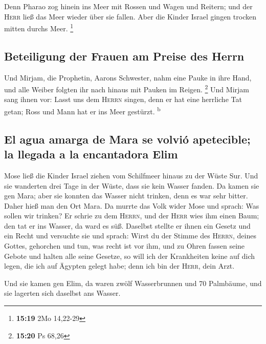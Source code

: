  Denn Pharao zog hinein ins Meer mit Rossen und Wagen und
Reitern; und der \textsc{Herr} ließ das Meer wieder über sie fallen.
Aber die Kinder Israel gingen trocken mitten durchs Meer. \footnote{\textbf{15:19}
  2Mo 14,22-29}

\hypertarget{beteiligung-der-frauen-am-preise-des-herrn}{%
\subsection{Beteiligung der Frauen am Preise des
Herrn}\label{beteiligung-der-frauen-am-preise-des-herrn}}

 Und Mirjam, die Prophetin, Aarons Schwester, nahm eine
Pauke in ihre Hand, und alle Weiber folgten ihr nach hinaus mit Pauken
im Reigen. \footnote{\textbf{15:20} Ps 68,26}  Und Mirjam
sang ihnen vor: Lasst uns dem \textsc{Herrn} singen, denn er hat eine
herrliche Tat getan; Ross und Mann hat er ins Meer gestürzt.
\textsuperscript{b}

\hypertarget{el-agua-amarga-de-mara-se-volviuxf3-apetecible-la-llegada-a-la-encantadora-elim}{%
\subsection{El agua amarga de Mara se volvió apetecible; la llegada a la
encantadora
Elim}\label{el-agua-amarga-de-mara-se-volviuxf3-apetecible-la-llegada-a-la-encantadora-elim}}

 Mose ließ die Kinder Israel ziehen vom Schilfmeer hinaus
zu der Wüste Sur. Und sie wanderten drei Tage in der Wüste, dass sie
kein Wasser fanden.  Da kamen sie gen Mara; aber sie
konnten das Wasser nicht trinken, denn es war sehr bitter. Daher hieß
man den Ort Mara.  Da murrte das Volk wider Mose und
sprach: Was sollen wir trinken?  Er schrie zu dem
\textsc{Herrn}, und der \textsc{Herr} wies ihm einen Baum; den tat er
ins Wasser, da ward es süß. Daselbst stellte er ihnen ein Gesetz und ein
Recht und versuchte sie  und sprach: Wirst du der Stimme
des \textsc{Herrn}, deines Gottes, gehorchen und tun, was recht ist vor
ihm, und zu Ohren fassen seine Gebote und halten alle seine Gesetze, so
will ich der Krankheiten keine auf dich legen, die ich auf Ägypten
gelegt habe; denn ich bin der \textsc{Herr}, dein Arzt.

 Und sie kamen gen Elim, da waren zwölf Wasserbrunnen und
70 Palmbäume, und sie lagerten sich daselbst ans Wasser.

